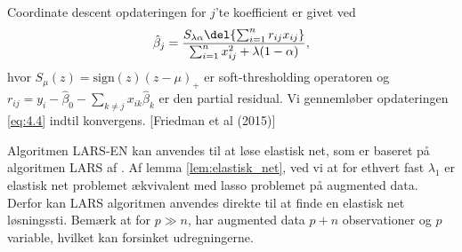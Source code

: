Coordinate descent opdateringen for $j$'te koefficient er givet ved
\begin{align}
\hat{\beta}_j = \frac{S_{\lambda \alpha} \del{\sum_{i=1}^n r_{ij} x_{ij}}}{\sum_{i=1}^n x_{ij}^2 + \lambda (1-\alpha)}, \label{eq:4.4}
\end{align} 
hvor $S_\mu(z)=\text{sign}(z)(z-\mu)_+$ er soft-thresholding operatoren og $r_{ij}=y_i - \hat{\beta}_0 - \sum_{k \neq j} x_{ik} \hat{\beta}_k$ er den partial residual.
Vi gennemløber opdateringen \eqref{eq:4.4} indtil konvergens.
[Friedman et al (2015)]

Algoritmen LARS-EN kan anvendes til at løse elastisk net, som er baseret på algoritmen LARS af \cite{efron}.
Af lemma \ref{lem:elastisk_net}, ved vi at for ethvert fast \(\lambda_1\) er elastisk net problemet ækvivalent med lasso problemet på augmented data.
Derfor kan LARS algoritmen anvendes direkte til at finde en elastisk net løsningssti.
Bemærk at for \(p \gg n\), har augmented data \(p+n\) observationer og \(p\) variable, hvilket kan forsinket udregningerne.


\newpage
